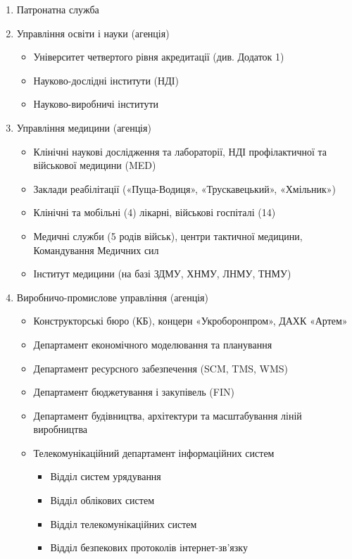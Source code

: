 \begin{enumerate}
    \item Патронатна служба
    \item Управління освіти і науки (агенція)
    \begin{itemize}
        \item Університет четвертого рівня акредитації (див. Додаток 1)
        \item Науково-дослідні інститути (НДІ)
        \item Науково-виробничі інститути
    \end{itemize}
    \item Управління медицини (агенція)
    \begin{itemize}
        \item Клінічні наукові дослідження та лабораторії, НДІ профілактичної та військової медицини (MED)
        \item Заклади реабілітації («Пуща-Водиця», «Трускавецький», «Хмільник»)
        \item Клінічні та мобільні (4) лікарні, військові госпіталі (14)
        \item Медичні служби (5 родів військ), центри тактичної медицини, Командування Медичних сил
        \item Інститут медицини (на базі ЗДМУ, ХНМУ, ЛНМУ, ТНМУ)
    \end{itemize}
    \item Виробничо-промислове управління (агенція)
    \begin{itemize}
        \item Конструкторські бюро (КБ), концерн «Укроборонпром», ДАХК «Артем»
        \item Департамент економічного моделювання та планування
        \item Департамент ресурсного забезпечення (SCM, TMS, WMS)
        \item Департамент бюджетування і закупівель (FIN)
        \item Департамент будівництва, архітектури та масштабування ліній виробництва
        \item Телекомунікаційний департамент інформаційних систем
        \begin{itemize}
            \item Відділ систем урядування
            \item Відділ облікових систем
            \item Відділ телекомунікаційних систем
            \item Відділ безпекових протоколів інтернет-зв'язку

\end{itemize}
\end{itemize}
\end{enumerate}
